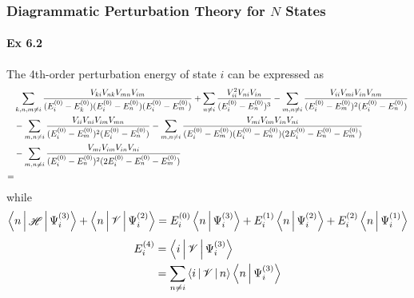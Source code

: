 \documentclass[a4paper]{article}
\DeclareMathOperator{\sH}{\mathscr{H}}
\newcommand{\ex}[1]{\paragraph{Ex #1}}
\numberwithin{equation}{subsection}
\begin{document}
\subsubsection{Diagrammatic Perturbation Theory for $ N $ States}
\ex{6.2}
The 4th-order perturbation energy of state $ i $ can be expressed as
\begin{align}
&\sum_{k,n,m\neq i} \dfrac{V_{ki}V_{nk}V_{mn}V_{im}}{(E_i^{(0)}-E_k^{(0)})(E_i^{(0)}-E_n^{(0)})(E_i^{(0)}-E_m^{(0)})} + \sum_{n\neq i} \dfrac{V_{ii}^2 V_{ni}V_{in}}{(E_i^{(0)}-E_n^{(0)})^3} - \sum_{m,n\neq i} \dfrac{V_{ii}V_{mi}V_{in}V_{nm}}{(E_i^{(0)}-E_m^{(0)})^2(E_i^{(0)}-E_n^{(0)})} \notag\\
&- \sum_{m,n\neq i} \dfrac{V_{ii}V_{ni}V_{im}V_{mn}}{(E_i^{(0)}-E_m^{(0)})^2(E_i^{(0)}-E_n^{(0)})} - \sum_{m,n\neq i} \dfrac{V_{mi}V_{im}V_{in}V_{ni}}{(E_i^{(0)}-E_m^{(0)})(E_i^{(0)}-E_n^{(0)})(2E_i^{(0)}-E_n^{(0)}-E_m^{(0)})} \notag\\
&- \sum_{m,n\neq i} \dfrac{V_{mi}V_{im}V_{in}V_{ni}}{(E_i^{(0)}-E_n^{(0)})^2(2E_i^{(0)}-E_n^{(0)}-E_m^{(0)})} \notag\\
=& 
\end{align}
while
\begin{equation}\label{key}
\Braket{n | \sH | \Psi_i^{(3)}} + \Braket{n | \mathscr{V} | \Psi_i^{(2)}} = E_i^{(0)} \Braket{n|\Psi_i^{(3)}} + E_i^{(1)} \Braket{n|\Psi_i^{(2)}} + E_i^{(2)} \Braket{n|\Psi_i^{(1)}}
\end{equation}
\begin{align}
E_i^{(4)} &= \Braket{i | \mathscr{V} | \Psi_i^{(3)}} \notag\\
&= \sum_{n\neq i} \Braket{i | \mathscr{V} | n} \Braket{n| \Psi_i^{(3)}}
\end{align}
\end{document}
